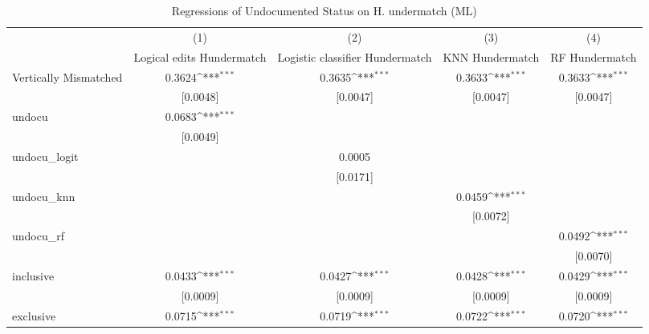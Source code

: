 \begin{table}[htbp]\centering
\def\sym#1{\ifmmode^{#1}\else\(^{#1}\)\fi}
\caption{Regressions of Undocumented Status on H. undermatch (ML)}
\begin{tabular}{l*{4}{c}}
\toprule
                    &\multicolumn{1}{c}{(1)}         &\multicolumn{1}{c}{(2)}         &\multicolumn{1}{c}{(3)}         &\multicolumn{1}{c}{(4)}         \\
                    &Logical edits Hundermatch         &Logistic classifier Hundermatch         &KNN Hundermatch         &RF Hundermatch         \\
\midrule
Vertically Mismatched&      0.3624\sym{***}&      0.3635\sym{***}&      0.3633\sym{***}&      0.3633\sym{***}\\
                    &    [0.0048]         &    [0.0047]         &    [0.0047]         &    [0.0047]         \\
\addlinespace
undocu              &      0.0683\sym{***}&                     &                     &                     \\
                    &    [0.0049]         &                     &                     &                     \\
\addlinespace
undocu\_logit        &                     &      0.0005         &                     &                     \\
                    &                     &    [0.0171]         &                     &                     \\
\addlinespace
undocu\_knn          &                     &                     &      0.0459\sym{***}&                     \\
                    &                     &                     &    [0.0072]         &                     \\
\addlinespace
undocu\_rf           &                     &                     &                     &      0.0492\sym{***}\\
                    &                     &                     &                     &    [0.0070]         \\
\addlinespace
inclusive           &      0.0433\sym{***}&      0.0427\sym{***}&      0.0428\sym{***}&      0.0429\sym{***}\\
                    &    [0.0009]         &    [0.0009]         &    [0.0009]         &    [0.0009]         \\
\addlinespace
exclusive           &      0.0715\sym{***}&      0.0719\sym{***}&      0.0722\sym{***}&      0.0720\sym{***}\\

\end{tabular}
\end{table}
